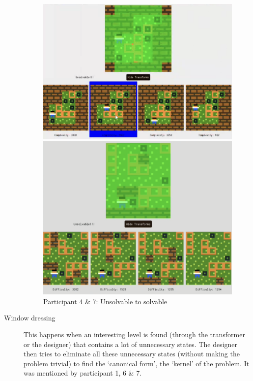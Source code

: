 \begin{description}
\begin{figure}[!htbp]
\begin{minipage}{0.5\textwidth}
\centering
\includegraphics[width=\textwidth]{figures/unsolvablepart4.png}
\end{minipage}  \hfill
\begin{minipage}{0.5\textwidth}
\centering
\includegraphics[width=\textwidth]{figures/unsolvablepart72.png}
\end{minipage}
\caption{Participant 4 \& 7: Unsolvable to solvable}
\end{figure}

\item[Window dressing] This happens when an interesting level is found (through the transformer or the designer) that contains a lot of unnecessary states. The designer then tries to eliminate all these unnecessary states (without making the problem trivial) to find the `canonical form', the `kernel' of the problem. It was mentioned by participant 1, 6 \& 7.


\end{description}
